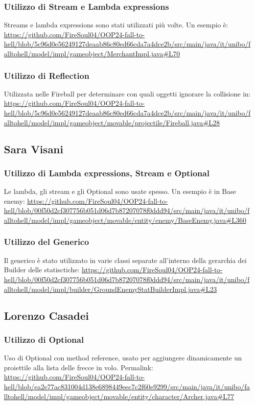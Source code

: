 \documentclass[a4paper,12pt]{report}
\begin{document}
\subsubsection{Utilizzo di Stream e Lambda expressions}
Streams e lambda expressions sono stati utilizzati più volte. Un esempio è:
\url{https://github.com/FireSoul04/OOP24-fall-to-hell/blob/5c96d0e56249127deaab86c80ed66cda7a4dce2b/src/main/java/it/unibo/falltohell/model/impl/gameobject/MerchantImpl.java#L70}

\subsubsection{Utilizzo di Reflection}
Utilizzata nelle Fireball per determinare con quali oggetti ignorare la collisione in:
\url{https://github.com/FireSoul04/OOP24-fall-to-hell/blob/5c96d0e56249127deaab86c80ed66cda7a4dce2b/src/main/java/it/unibo/falltohell/model/impl/gameobject/movable/projectile/Fireball.java#L28}

\subsection{Sara Visani}

\subsubsection{Utilizzo di Lambda expressions, Stream e Optional}
Le lambda, gli stream e gli Optional sono usate spesso. Un esempio è in Base enemy: \url{https://github.com/FireSoul04/OOP24-fall-to-hell/blob/00f50d2cf307756b051d06d7b87207078f0ddd94/src/main/java/it/unibo/falltohell/model/impl/gameobject/movable/entity/enemy/BaseEnemy.java#L360}

\subsubsection{Utilizzo del Generico}
Il generico è stato utilizzato in varie classi separate all'interno della gerarchia dei Builder delle statisctiche: \url{https://github.com/FireSoul04/OOP24-fall-to-hell/blob/00f50d2cf307756b051d06d7b87207078f0ddd94/src/main/java/it/unibo/falltohell/model/impl/builder/GroundEnemyStatBuilderImpl.java#L23}

\subsection{Lorenzo Casadei}

\subsubsection{Utilizzo di Optional}
Uso di Optional con method reference, usato per aggiungere dinamicamente un proiettile alla lista delle frecce in volo. Permalink: \url{https://github.com/FireSoul04/OOP24-fall-to-hell/blob/ea2e77ac831004d138e6898449eec7c2f60e9299/src/main/java/it/unibo/falltohell/model/impl/gameobject/movable/entity/character/Archer.java#L77}
\end{document}
